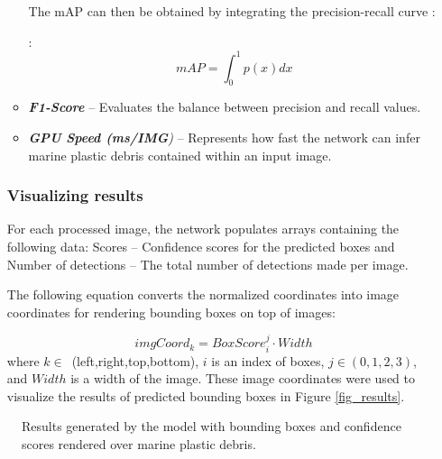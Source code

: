\documentclass[a4paper,fleqn]{cas-dc}
\begin{document}
\begin{enumerate}[label={\alph*})]
\begin{itemize}
The mAP can then be obtained by integrating the precision-recall curve \cite{10.1007/978-3-642-40994-3_29}:

 \cite{10.1007/978-3-642-40994-3_29}:
\[  mAP = \int_{0}^{1} p(x) dx \]


\item \textit{\textbf{F1-Score}} -- Evaluates the balance between precision and recall values.

\item \textit{\textbf{GPU Speed (ms/IMG})} -- Represents how fast the network can infer marine plastic debris contained within an input image.

\end{itemize}


\subsubsection{Visualizing results}
For each processed image, the network populates arrays containing the following data: Scores -- Confidence scores for the predicted boxes and Number of detections -- The total number of detections made per image.

The following equation converts the normalized coordinates into image coordinates for rendering bounding boxes on top of images:

\begin{equation}
imgCoord_k = BoxScore_{i}^{j}\cdot Width
\end{equation}
where $k\in$~(left,right,top,bottom), $i$ is an index of boxes, $j \in(0,1,2,3)$, and $Width$ is a width of the image. These image coordinates were used to visualize the results of predicted bounding boxes in Figure \ref{fig_results}.
\iffalse
\begin{itemize}
\item \textit{\(left\_coordinate=boxes[index][1] * image\_width\)}
\item \textit{\(right\_coordinate=boxes[index][3] * image\_width\)}
\item \textit{\(top\_coordinate=boxes[index][0] * image\_width\)}
\item \textit{\(low\_coordinate=boxes[index][2] * image\_width\)}
\end{itemize}
\fi

\end{enumerate}

\begin{figure}[ht]
    \centering
{}
    \caption{Results generated by the model with bounding boxes and confidence scores rendered over marine plastic debris.}
\label{fig_initial_results}
\end{figure}
\end{document}
